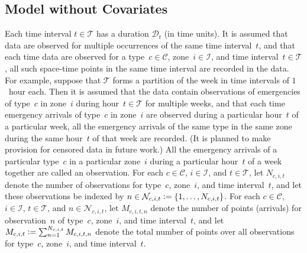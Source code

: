 \documentclass[article]{jss}
\def\defi{\vcentcolon=}
\begin{document}
\subsection{Model without Covariates}
\label{sec:model1}

Each time interval $t \in \mathcal{T}$ has a duration $\mathcal{D}_{t}$ (in time units).
It is assumed that data are observed for multiple occurrences of the same time interval~$t$, and that each time data are observed for a type~$c \in \mathcal{C}$, zone~$i \in \mathcal{I}$, and time interval~$t \in \mathcal{T}$, all such space-time points in the same time interval are recorded in the data.
For example, suppose that $\mathcal{T}$ forms a partition of the week in time intervals of $1$~hour each.
Then it is assumed that the data contain observations of emergencies of type~$c$ in zone~$i$ during hour~$t \in \mathcal{T}$ for multiple weeks, and that each time emergency arrivals of type~$c$ in zone~$i$ are observed during a particular hour~$t$ of a particular week, all the emergency arrivals of the same type in the same zone during the same hour~$t$ of that week are recorded.
(It is planned to make provision for censored data in future work.)
All the emergency arrivals of a particular type~$c$ in a particular zone~$i$ during a particular hour~$t$ of a week together are called an observation.
For each $c \in \mathcal{C}$, $i \in \mathcal{I}$, and $t \in \mathcal{T}$, let $N_{c,i,t}$ denote the number of observations for type~$c$, zone~$i$, and time interval~$t$, and let these observations be indexed by $n \in \mathcal{N}_{c,i,t} \defi \{1,\ldots,N_{c,i,t}\}$.
For each $c \in \mathcal{C}$, $i \in \mathcal{I}$, $t \in \mathcal{T}$, and $n \in \mathcal{N}_{c,i,t}$, let $M_{c,i,t,n}$ denote the number of points (arrivals) for observation~$n$ of type~$c$, zone~$i$, and time interval~$t$, and let $M_{c,i,t} \defi \sum_{n=1}^{N_{c,i,t}} M_{c,i,t,n}$ denote the total number of points over all observations for type~$c$, zone~$i$, and time interval~$t$.
\end{document}
